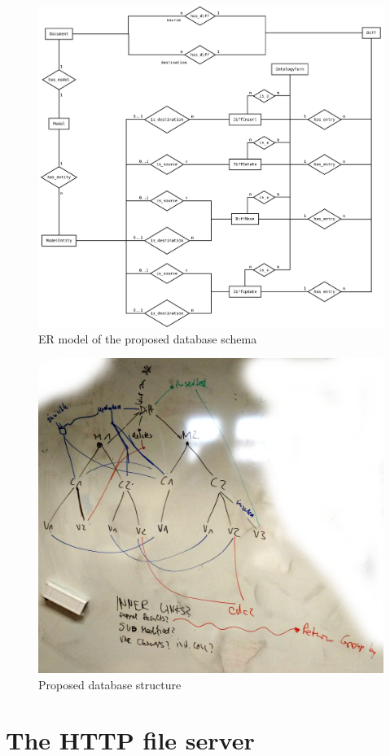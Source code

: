 \begin{figure}
	\centering
	\includegraphics[width=\textwidth]{resources/db-concept-er.pdf}
	\caption{ER model of the proposed database schema}
	\label{fig:db-er-model}
\end{figure}

\begin{figure}[h]
	\includegraphics[width=\textwidth]{resources/db_structure.jpg}
	\caption{Proposed database structure}
	\label{fig:db-model}
\end{figure}

\section{The HTTP file server}
\label{sec:concept:filestorage}
